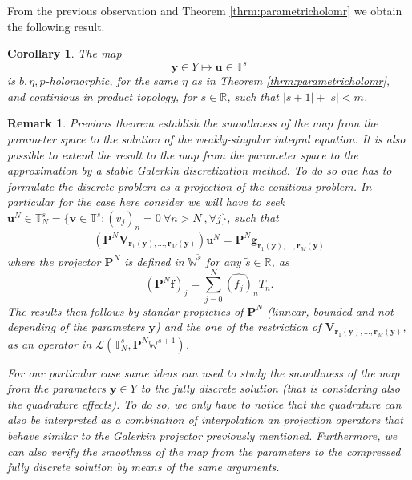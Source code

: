 \documentclass{article}
\newtheorem{corollary}[theorem]{Corollary}
\newtheorem{remark}[theorem]{Remark}
\newcommand{\bg}{\bm{g}}
\newcommand{\IR}{{\mathbb R}}
\newcommand{\bu}{\bm{u}}
\newcommand{\bv}{\bm{v}}
\newcommand{\br}{\bm{r}}
\newcommand{\by}{\bm{y}}
\begin{document}
From the previous observation and Theorem \ref{thrm:parametricholomr} we obtain the following result. 
\begin{corollary}
The map 
$$
\by \in Y \mapsto \bu \in \mathbb{T}^s 
$$
is $b,\eta,p$-holomorphic, for the same $\eta$ as in Theorem \ref{thrm:parametricholomr}, and continious in product topology, for $s \in \IR$, such that $|s+1|+|s| < m$.  
\end{corollary}
\begin{remark}
\label{remm:discretholm}
Previous theorem establish the smoothness of the map from the parameter space to the solution of the weakly-singular integral equation. It is also possible to extend the result to the map from the parameter space to the approximation by a stable Galerkin discretization method. To do so one has to formulate the discrete problem as a projection of the conitious problem. In particular for the case here consider we will have to seek $\bu^N \in \mathbb{T}^s_N = \{\bv \in  \mathbb{T}^s : (v_j)_n = 0 \ \forall n >N \ ,\forall j\}$, such that 
\begin{align*}
(\mathbf{P}^N \mathbf{V}_{\br_1(\by),\hdots,\br_M(\by)}) \bu^N = \mathbf{P}^N\bg_{\br_1(\by),\hdots,\br_M(\by)}
\end{align*} 
where the projector $\mathbf{P}^N$ is defined in $\mathbb{W}^{\widetilde{s}}$ for any $\widetilde{s} \in \IR$, as 
$$(\mathbf{P}^N \mathbf{f})_j  = \sum_{j=0}^N \widehat{(f_j)}_n T_n.$$ 
The results then follows by standar propieties of $\mathbf{P}^N$ (linnear, bounded and not depending of the parameters $\by$) and the one of the restriction of $\mathbf{V}_{\br_1(\by),\hdots,\br_M(\by)}$, as an operator in $\mathcal{L}(\mathbb{T}^s_N , \mathbf{P}^N \mathbb{W}^{s+1})$.

 For our particular case same ideas can used to study the smoothness of the map from the parameters $\by \in Y$ to the fully discrete solution (that is considering also the quadrature effects). To do so, we only have to notice that the quadrature can also be interpreted as a combination of interpolation an projection operators that behave similar to the Galerkin projector previously mentioned. Furthermore, we can also verify the smoothnes of the map from the parameters to the compressed fully discrete solution by means of the same arguments. 
\end{remark}

\appendix
\end{document}
